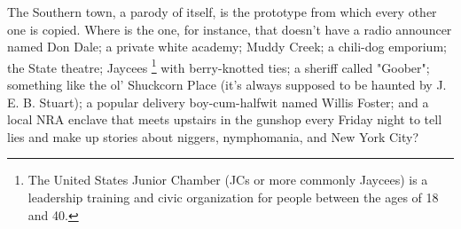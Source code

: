   The Southern town, a parody of itself, is the prototype from which every other
one is copied. Where is the one, for instance, that doesn't have a radio
announcer named Don Dale; a private white academy; Muddy Creek; a chili-dog
emporium; 
the State theatre; Jaycees 
\footnote{ The United States Junior Chamber (JCs or more commonly Jaycees) is a
leadership training and civic organization for people between the ages of 18 and
40.}
with berry-knotted ties; a sheriff called "Goober"; something like the ol' 
Shuckcorn Place (it's always supposed to be haunted by J. E. B. Stuart); a 
popular delivery boy-cum-halfwit named Willis Foster; and a local NRA enclave 
that meets upstairs in the gunshop every Friday
night to tell lies and make up stories about niggers, nymphomania, 
and New York City?

